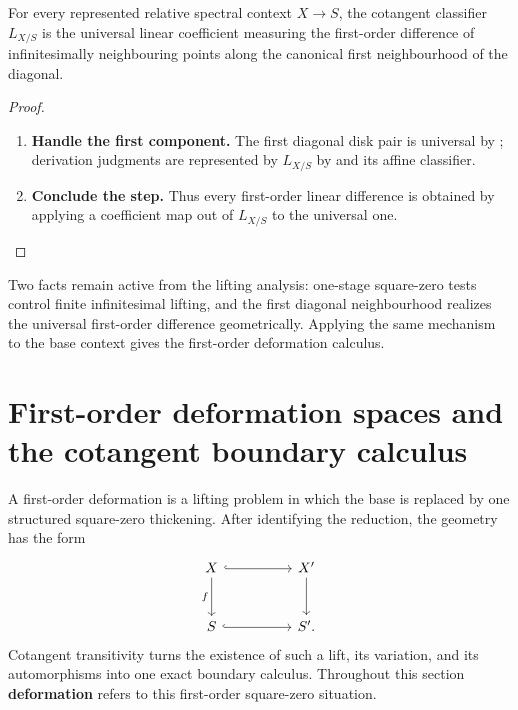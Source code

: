 \begin{corollary}
\label{cor:cotangent-linearizes-infinitesimal-equality}
For every represented relative spectral context \(X\to S\), the cotangent
classifier \(L_{X/S}\) is the universal linear coefficient measuring the
first-order difference of infinitesimally neighbouring points along the
canonical first neighbourhood of the diagonal.
\end{corollary}

\begin{proof}
\leavevmode
\begin{enumerate}[label=\textup{(\arabic*)}]
    \item \textbf{Handle the first component.}
    The first diagonal disk pair is universal by
    ; derivation judgments are represented by
    \(L_{X/S}\) by  and its affine classifier.

    \item \textbf{Conclude the step.}
    Thus every first-order linear difference is obtained by applying a coefficient map out of
    \(L_{X/S}\) to the universal one.
\end{enumerate}
\end{proof}
Two facts remain active from the lifting analysis: one-stage square-zero tests
control finite infinitesimal lifting, and the first diagonal neighbourhood
realizes the universal first-order difference geometrically. Applying the same
mechanism to the base context gives the first-order deformation calculus.

\section{First-order deformation spaces and the cotangent boundary calculus}
\label{sec:first-order-deformation-boundary}

A first-order deformation is a lifting problem in which the base is replaced
by one structured square-zero thickening. After identifying the reduction,
the geometry has the form
\[
\begin{tikzcd}[column sep=huge,row sep=large]
X \arrow[r,hook] \arrow[d,"f"']
    & X' \arrow[d]
\\
S \arrow[r,hook]
    & S'.
\end{tikzcd}
\]
Cotangent transitivity turns the existence of such a lift, its variation, and
its automorphisms into one exact boundary calculus. Throughout this section
\textbf{deformation} refers to this first-order square-zero situation.

